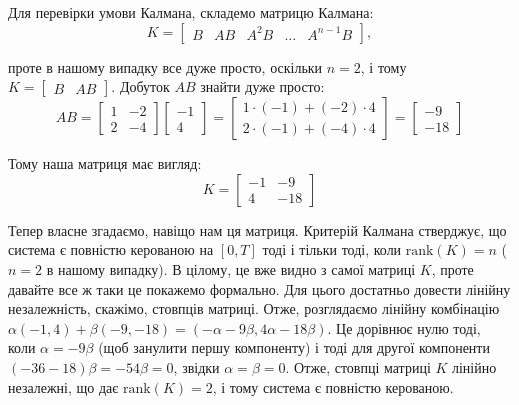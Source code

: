 \documentclass{hw_template}
\begin{document}
Для перевірки умови Калмана, складемо матрицю Калмана:
\begin{equation*}
    K = \begin{bmatrix}
        B & AB & A^2B & \dots & A^{n-1}B
    \end{bmatrix},
\end{equation*}

проте в нашому випадку все дуже просто, оскільки $n=2$, і тому $K = \begin{bmatrix}
    B & AB
\end{bmatrix}$. Добуток $AB$ знайти дуже просто:
\begin{equation*}
    AB = \begin{bmatrix}
        1 & -2 \\
        2 & -4
    \end{bmatrix}\begin{bmatrix}
        -1 \\ 4
    \end{bmatrix} = \begin{bmatrix}
        1 \cdot (-1) + (-2) \cdot 4 \\
        2 \cdot (-1) + (-4) \cdot 4
    \end{bmatrix} = \begin{bmatrix}
        -9 \\ -18
    \end{bmatrix}
\end{equation*}

Тому наша матриця має вигляд:
\begin{equation*}
    K = \begin{bmatrix}
        -1 & -9 \\
        4 & -18
    \end{bmatrix}
\end{equation*}

Тепер власне згадаємо, навіщо нам ця матриця. Критерій Калмана стверджує, що система є повністю керованою на $[0,T]$ тоді і тільки тоді, коли $\text{rank}(K) = n$ ($n=2$ в нашому випадку). В цілому, це вже видно з самої матриці $K$, проте давайте все ж таки це покажемо формально. Для цього достатньо довести лінійну незалежність, скажімо, стовпців матриці. Отже, розглядаємо лінійну комбінацію $\alpha(-1, 4)+\beta(-9,-18) = (-\alpha-9\beta,4\alpha-18\beta)$. Це дорівнює нулю тоді, коли $\alpha=-9\beta$ (щоб занулити першу компоненту) і тоді для другої компоненти $(-36-18)\beta = -54\beta = 0$, звідки $\alpha=\beta=0$. Отже, стовпці матриці $K$ лінійно незалежні, що дає $\text{rank}(K) = 2$, і тому система є повністю керованою.
\end{document}
